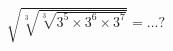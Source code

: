 \documentclass[preview]{standalone}
\begin{document}
\begin{align*}
\sqrt{\sqrt[3]{\sqrt[3]{3^5 \times 3^6 \times 3^7}}} = \dots?
\end{align*}
\end{document}
